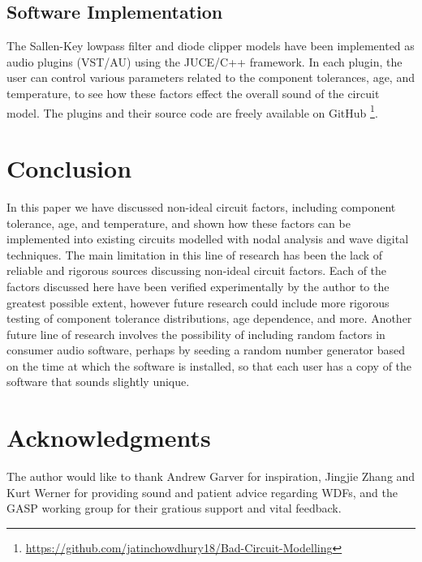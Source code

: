 \documentclass[twoside,a4paper]{article}
\begin{document}
\subsection{Software Implementation} \label{sec:soft-impl}
%
The Sallen-Key lowpass filter and diode clipper models have been implemented
as audio plugins (VST/AU) using the JUCE/C++ framework. In each plugin,
the user can control various parameters related to the component
tolerances, age, and temperature, to see how these factors effect the
overall sound of the circuit model. The plugins and their source code are
freely available on GitHub
\footnote{\url{https://github.com/jatinchowdhury18/Bad-Circuit-Modelling}}.

\section{Conclusion} \label{sec:conclusion}
%
In this paper we have discussed non-ideal circuit factors, including
component tolerance, age, and temperature, and shown how these factors
can be implemented into existing circuits modelled with nodal analysis
and wave digital techniques.
\newline\newline
The main limitation in this line of research has been the lack of
reliable and rigorous sources discussing non-ideal circuit factors.
Each of the factors discussed here have been verified experimentally
by the author to the greatest possible extent, however future research
could include more rigorous testing of component tolerance distributions,
age dependence, and more. Another future line of research involves the
possibility of including random factors in consumer audio software, perhaps
by seeding a random number generator based on the time at which the
software is installed, so that each user has a copy of the software that
sounds slightly unique.

\section{Acknowledgments}
%
The author would like to thank Andrew Garver for inspiration, Jingjie Zhang
and Kurt Werner for providing sound and patient advice regarding WDFs, and the
GASP working group for their gratious support and vital feedback.



\end{document}
